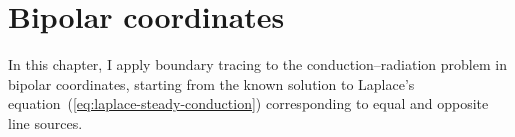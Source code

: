 \chapter{Bipolar coordinates}
\label{ch:bipolar}

In this chapter,
I apply boundary tracing to the conduction--radiation problem
in bipolar coordinates,
starting from the known solution
to Laplace's equation~(\ref{eq:laplace-steady-conduction})
corresponding to equal and opposite line sources.
